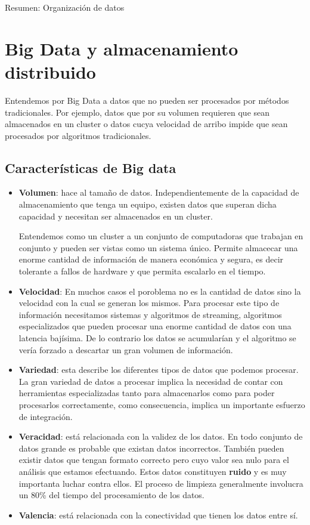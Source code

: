 \documentclass[titlepage,a4paper]{article}
\begin{document}
\begin{Huge}
Resumen: Organización de datos
\end{Huge}
\section*{Big Data y almacenamiento distribuido}
Entendemos por Big Data a datos que no pueden ser procesados por métodos tradicionales. Por ejemplo, datos que por su volumen requieren que sean almacenados en un cluster o datos cucya velocidad de arribo impide que sean procesados por algoritmos tradicionales. 
\subsection*{Características de Big data}
\begin{itemize}
\item \textbf{Volumen}:  hace al tamaño de datos. Independientemente de la capacidad de almacenamiento que tenga un equipo, existen datos que superan dicha capacidad y necesitan ser almacenados en un cluster. 

Entendemos como un cluster a un conjunto de computadoras que trabajan en conjunto y pueden ser vistas como un sistema único. Permite almacecar una enorme cantidad de información de manera económica y segura, es decir tolerante a fallos de hardware y que permita escalarlo en el tiempo. 
\item \textbf{Velocidad}: En muchos casos el poroblema no es la cantidad de datos sino la velocidad con la cual se generan los mismos.  Para procesar este  tipo de información necesitamos sistemas y algoritmos de streaming, algoritmos especializados que pueden procesar una enorme cantidad de datos con una latencia bajísima. De lo contrario los datos se acumularían y el algoritmo se vería forzado a descartar un gran volumen de información. 
\item \textbf{Variedad}: esta describe los diferentes tipos de datos que podemos procesar. La gran variedad de datos a procesar implica la necesidad de contar con herramientas especializadas tanto para almacenarlos como para poder procesarlos correctamente, como consecuencia, implica un importante esfuerzo de integración. 
\item \textbf{Veracidad}: está relacionada con la validez de los datos. En todo conjunto de datos grande es probable que existan datos incorrectos. También pueden existir datos que tengan formato correcto pero cuyo valor sea nulo para el análisis que estamos efectuando. Estos datos constituyen \textbf{ruido} y es muy importanta luchar contra ellos. El proceso de limpieza generalmente involucra un 80\% del tiempo del procesamiento de los datos. 
\item \textbf{Valencia}: está relacionada con la conectividad que tienen los datos entre sí. 
\end{itemize}
\end{document}
